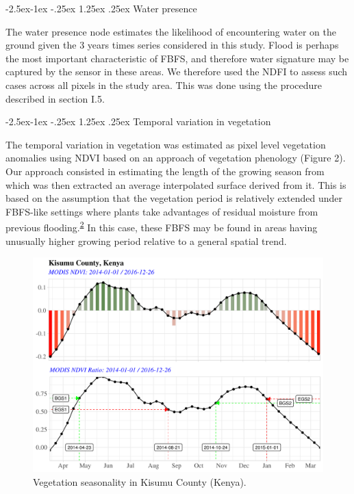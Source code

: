 \documentclass[12pt,oneside]{article}
\makeatletter
\renewcommand\paragraph{\@startsection{paragraph}{4}{\z@}%
            {-2.5ex\@plus -1ex \@minus -.25ex}%
            {1.25ex \@plus .25ex}%
            {\normalfont\normalsize\bfseries}}
\makeatother
\begin{document}
\hypertarget{I.5.2.7}{%
\paragraph{Water presence}\label{I.5.2.7}}

The water presence node estimates the likelihood of encountering water
on the ground given the 3 years times series considered in this study.
Flood is perhaps the most important characteristic of FBFS, and
therefore water signature may be captured by the sensor in these areas.
We therefore used the NDFI to assess such cases across all pixels in the
study area. This was done using the procedure described in section I.5.

\hypertarget{I.5.2.8}{%
\paragraph{Temporal variation in vegetation}\label{I.5.2.8}}

The temporal variation in vegetation was estimated as pixel level
vegetation anomalies using NDVI based on an approach of vegetation
phenology (Figure 2). Our approach consisted in estimating the length of
the growing season from which was then extracted an average interpolated
surface derived from it. This is based on the assumption that the
vegetation period is relatively extended under FBFS-like settings where
plants take advantages of residual moisture from previous
flooding.\textsuperscript{\protect\hyperlink{ref-VanSteenbergen_et_al_2010}{2}}
In this case, these FBFS may be found in areas having unusually higher
growing period relative to a general spatial trend.

\begin{figure}
\includegraphics[width=1\linewidth]{figures/Mapping_FBFS_vegetation_seasonality} \caption{Vegetation seasonality in Kisumu County (Kenya).}\label{fig:fig2}
\end{figure}
\end{document}
